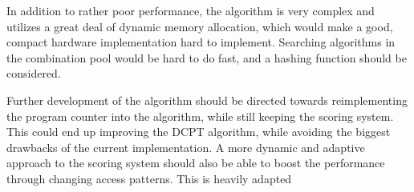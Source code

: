In addition to rather poor performance, the algorithm is very complex and utilizes a great deal of dynamic memory allocation, which would make a good, compact hardware implementation hard to implement. Searching algorithms in the combination pool would be hard to do fast, and a hashing function should be considered.


Further development of the algorithm should be directed towards reimplementing the program counter into the algorithm, while still keeping the scoring system. This could end up improving the DCPT algorithm, while avoiding the biggest drawbacks of the current implementation. A more dynamic and adaptive approach to the scoring system should also be able to boost the performance through changing access patterns. This is heavily adapted 


%
%
%
